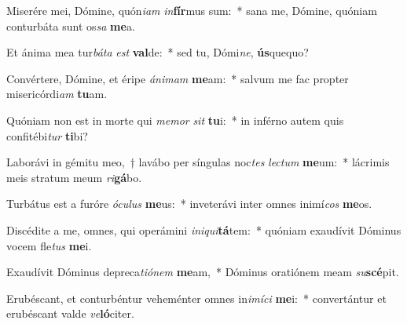\item Miserére mei, Dómine, quón\textit{i}\textit{am} \textit{in}\textbf{fír}mus sum:~* sana me, Dómine, quóniam conturbáta sunt os\textit{sa} \textbf{me}a.
\item Et ánima mea tur\textit{bá}\textit{ta} \textit{est} \textbf{val}de:~* sed tu, Dómi\textit{ne}, \textbf{ús}quequo?
\item Convértere, Dómine, et éripe \textit{á}\textit{ni}\textit{mam} \textbf{me}am:~* salvum me fac propter misericórdi\textit{am} \textbf{tu}am.
\item Quóniam non est in morte qui \textit{me}\textit{mor} \textit{sit} \textbf{tu}i:~* in inférno autem quis confitébi\textit{tur} \textbf{ti}bi?
\item Laborávi in gémitu meo,~† lavábo per síngulas noc\textit{tes} \textit{lec}\textit{tum} \textbf{me}um:~* lácrimis meis stratum meum \textit{ri}\textbf{gá}bo.
\item Turbátus est a furóre \textit{ó}\textit{cu}\textit{lus} \textbf{me}us:~* inveterávi inter omnes inimí\textit{cos} \textbf{me}os.
\item Discédite a me, omnes, qui operámini \textit{in}\textit{i}\textit{qui}\textbf{tá}tem:~* quóniam exaudívit Dóminus vocem fle\textit{tus} \textbf{me}i.
\item Exaudívit Dóminus depreca\textit{ti}\textit{ó}\textit{nem} \textbf{me}am,~* Dóminus oratiónem meam \textit{su}\textbf{scé}pit.
\item Erubéscant, et conturbéntur veheménter omnes in\textit{i}\textit{mí}\textit{ci} \textbf{me}i:~* convertántur et erubéscant valde \textit{ve}\textbf{ló}citer.
